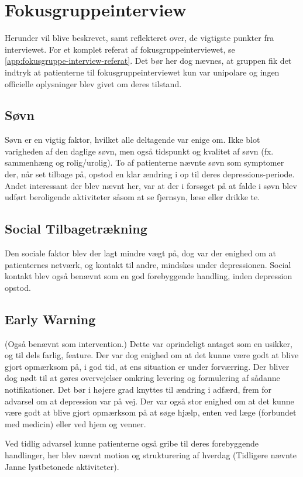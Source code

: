\section{Fokusgruppeinterview}
Herunder vil blive beskrevet, samt reflekteret over, de vigtigste punkter fra interviewet.
For et komplet referat af fokusgruppeinterviewet, se \cref{app:fokusgruppe-interview-referat}.
Det bør her dog nævnes, at gruppen fik det indtryk at patienterne til fokusgruppeinterviewet kun var unipolare og ingen officielle oplysninger blev givet om deres tilstand.

\subsection{Søvn}
Søvn er en vigtig faktor, hvilket alle deltagende var enige om.
Ikke blot varigheden af den daglige søvn, men også tidspunkt og kvalitet af søvn (fx. sammenhæng og rolig/urolig).
To af patienterne nævnte søvn som symptomer der, når set tilbage på, opstod en klar ændring i op til deres depressions-periode.
Andet interessant der blev nævnt her, var at der i forsøget på at falde i søvn blev udført beroligende aktiviteter såsom at se fjernsyn, læse eller drikke te.

\subsection{Social Tilbagetrækning}
Den sociale faktor blev der lagt mindre vægt på, dog var der enighed om at patienternes netværk, og kontakt til andre, mindskes under depressionen.
Social kontakt blev også benævnt som en god forebyggende handling, inden depression opstod.

\subsection{Early Warning}
(Også benævnt som intervention.)
Dette var oprindeligt antaget som en usikker, og til dels farlig, feature.
Der var dog enighed om at det kunne være godt at blive gjort opmærksom på, i god tid, at ens situation er under forværring.
Der bliver dog nødt til at gøres overvejelser omkring levering og formulering af sådanne notifikationer.
Det bør i højere grad knyttes til ændring i adfærd, frem for advarsel om at depression var på vej.
Der var også stor enighed om at det kunne være godt at blive gjort opmærksom på at søge hjælp, enten ved læge (forbundet med medicin) eller ved hjem og venner.

Ved tidlig advarsel kunne patienterne også gribe til deres forebyggende handlinger, her blev nævnt motion og strukturering af hverdag 
(Tidligere nævnte Janne lystbetonede aktiviteter).

